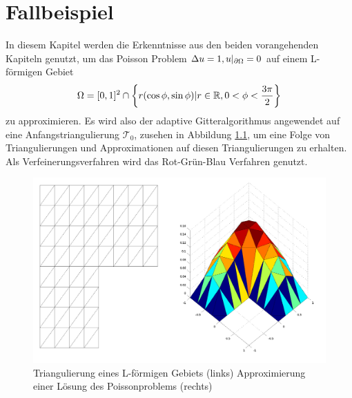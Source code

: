 \chapter{Fallbeispiel}
In diesem Kapitel werden die Erkenntnisse aus den beiden vorangehenden Kapiteln genutzt, um das Poisson Problem $\Delta u = 1, u|_{\partial \Omega} = 0$ auf einem L-förmigen Gebiet   
\[
\Omega = [0,1]^2 \cap \left\{ r(\cos\phi,\sin\phi)| r\in\mathbb{R},0<\phi<\frac{3 \pi}{2} \right\}
\] 
zu approximieren. Es wird also der adaptive Gitteralgorithmus angewendet auf eine Anfangstriangulierung $\mathscr{T}_0$, zusehen in Abbildung \ref{grid}, um eine Folge von Triangulierungen und Approximationen auf diesen Triangulierungen zu erhalten. Als Verfeinerungsverfahren wird das Rot-Grün-Blau Verfahren genutzt.

\begin{figure}[!htbp]
	\begin{center}
		\includegraphics[width=13cm]{pics/nonref.png}
	\end{center}
	\caption{\label{grid}Triangulierung eines L-förmigen Gebiets (links) Approximierung einer Lösung des Poissonproblems (rechts)}
\end{figure}

